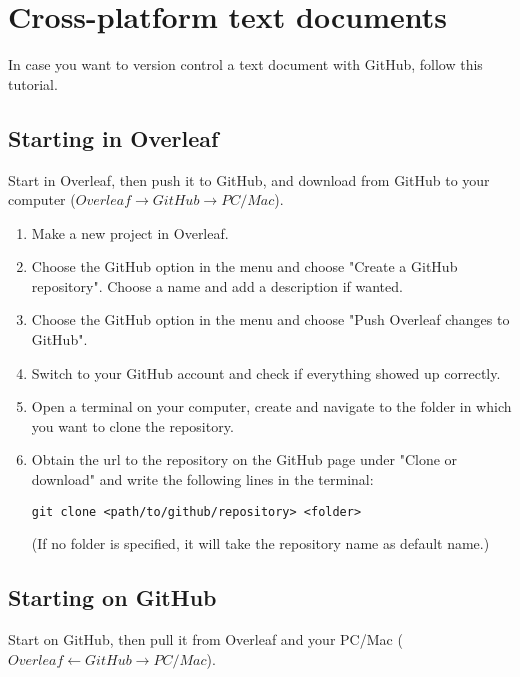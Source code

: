 \documentclass{report}
\begin{document}
\section{Cross-platform text documents}
In case you want to version control a text document with GitHub, follow this tutorial.

\subsection{Starting in Overleaf}
Start in Overleaf, then push it to GitHub, and download from GitHub to your computer
($Overleaf \rightarrow GitHub \rightarrow PC/Mac$).

\begin{enumerate}[noitemsep]
    \item Make a new project in Overleaf.
    \item Choose the GitHub option in the menu and choose "Create a GitHub repository". Choose a name and add a description if wanted.
    \item Choose the GitHub option in the menu and choose "Push Overleaf changes to GitHub".
    \item Switch to your GitHub account and check if everything showed up correctly.
    \item Open a terminal on your computer, create and navigate to the folder in which you want to clone the repository.
    \item Obtain the url to the repository on the GitHub page under "Clone or download" and write the following lines in the terminal: 
    \begin{verbatim}
git clone <path/to/github/repository> <folder>
    \end{verbatim}
    (If no folder is specified, it will take the repository name as default name.)
\end{enumerate}

\subsection{Starting on GitHub}
Start on GitHub, then pull it from Overleaf and your PC/Mac
($Overleaf \leftarrow GitHub \rightarrow PC/Mac$).
\end{document}

